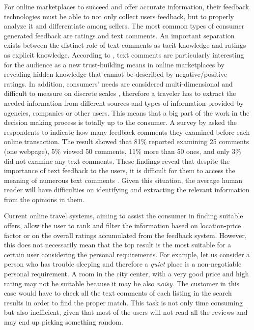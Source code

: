 For online marketplaces to succeed and offer accurate information, their feedback technologies must be able to not only collect users feedback, but to properly analyze it and differentiate among sellers. The most common types of consumer generated feedback are ratings and text comments.  An important separation exists between the distinct role of text comments as tacit knowledge and ratings as explicit knowledge. According to \cite{pavlou2006nature}, text comments are particularly interesting for the audience as a new trust-building means in online marketplaces by revealing hidden knowledge that cannot be described by negative/positive ratings. In addition, consumers' needs are considered multi-dimensional and difficult to measure on discrete scales \cite{luo2005information}, therefore a traveler has to extract the needed information from different sources and types of information provided by agencies, companies or other users. This means that a big part of the work in the decision making process is totally up to the consumer. A survey by \cite{pavlou2006institutional} asked the respondents to indicate how many feedback comments they examined before each online transaction. The result showed that 81\% reported examining 25 comments (one webpage), 5\% viewed 50 comments, 11\% more than 50 ones, and only 3\% did not examine any text comments. These findings reveal that despite the importance of text feedback to the users, it is difficult for them to access the meaning of numerous text comments \cite{pavlou2006institutional}.  Given this situation, the average human reader will have difficulties on identifying and extracting the relevant information from the opinions in them.  

Current online travel systems, aiming to assist the consumer in finding suitable offers, allow the user to rank and filter the information based on location-price factor or on the overall ratings accumulated from the feedback system. However, this does not necessarily mean that the top result is the most suitable for a certain user considering the personal requirements. For example, let us consider a person who has trouble sleeping and therefore  a \textit{quiet} place is a non-negotiable personal requirement. A room in the city center, with a very good price and high rating may not be suitable because it may be also \textit{noisy}. The customer in this case would have to check all the text comments of each listing in the search results in order to find the proper match. This task is not only time consuming but also inefficient, given that most of the users will not read all the reviews and may end up picking something random. 

